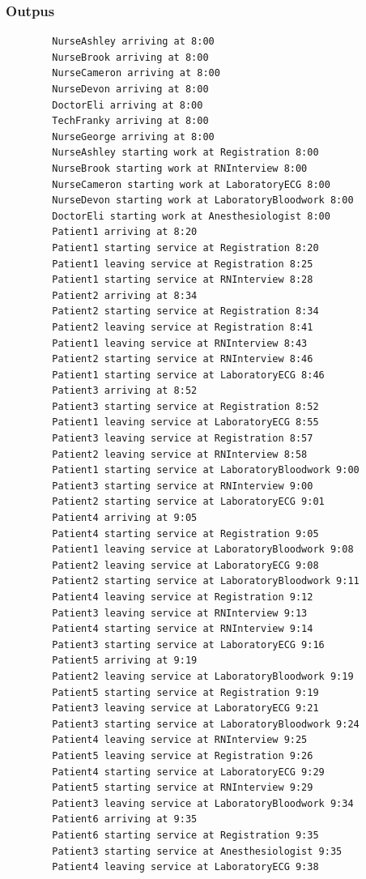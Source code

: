 \documentclass[12pt]{article}
\begin{document}
		\subsubsection{Outpus}
		\begin{verbatim}
		NurseAshley arriving at 8:00
		NurseBrook arriving at 8:00
		NurseCameron arriving at 8:00
		NurseDevon arriving at 8:00
		DoctorEli arriving at 8:00
		TechFranky arriving at 8:00
		NurseGeorge arriving at 8:00
		NurseAshley starting work at Registration 8:00
		NurseBrook starting work at RNInterview 8:00
		NurseCameron starting work at LaboratoryECG 8:00
		NurseDevon starting work at LaboratoryBloodwork 8:00
		DoctorEli starting work at Anesthesiologist 8:00
		Patient1 arriving at 8:20
		Patient1 starting service at Registration 8:20
		Patient1 leaving service at Registration 8:25
		Patient1 starting service at RNInterview 8:28
		Patient2 arriving at 8:34
		Patient2 starting service at Registration 8:34
		Patient2 leaving service at Registration 8:41
		Patient1 leaving service at RNInterview 8:43
		Patient2 starting service at RNInterview 8:46
		Patient1 starting service at LaboratoryECG 8:46
		Patient3 arriving at 8:52
		Patient3 starting service at Registration 8:52
		Patient1 leaving service at LaboratoryECG 8:55
		Patient3 leaving service at Registration 8:57
		Patient2 leaving service at RNInterview 8:58
		Patient1 starting service at LaboratoryBloodwork 9:00
		Patient3 starting service at RNInterview 9:00
		Patient2 starting service at LaboratoryECG 9:01
		Patient4 arriving at 9:05
		Patient4 starting service at Registration 9:05
		Patient1 leaving service at LaboratoryBloodwork 9:08
		Patient2 leaving service at LaboratoryECG 9:08
		Patient2 starting service at LaboratoryBloodwork 9:11
		Patient4 leaving service at Registration 9:12
		Patient3 leaving service at RNInterview 9:13
		Patient4 starting service at RNInterview 9:14
		Patient3 starting service at LaboratoryECG 9:16
		Patient5 arriving at 9:19
		Patient2 leaving service at LaboratoryBloodwork 9:19
		Patient5 starting service at Registration 9:19
		Patient3 leaving service at LaboratoryECG 9:21
		Patient3 starting service at LaboratoryBloodwork 9:24
		Patient4 leaving service at RNInterview 9:25
		Patient5 leaving service at Registration 9:26
		Patient4 starting service at LaboratoryECG 9:29
		Patient5 starting service at RNInterview 9:29
		Patient3 leaving service at LaboratoryBloodwork 9:34
		Patient6 arriving at 9:35
		Patient6 starting service at Registration 9:35
		Patient3 starting service at Anesthesiologist 9:35
		Patient4 leaving service at LaboratoryECG 9:38

\end{verbatim}
\end{document}
